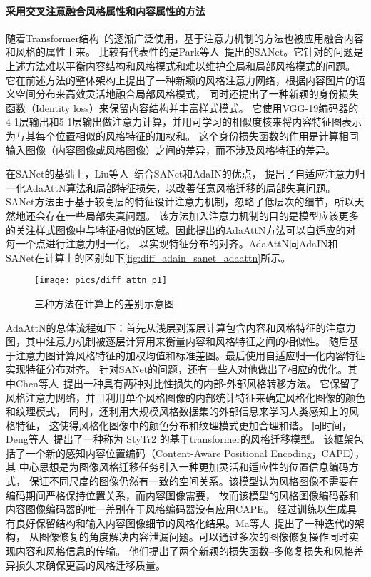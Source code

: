 \paragraph{采用交叉注意融合风格属性和内容属性的方法}
随着Transformer结构~\cite{vaswani2017attention}的逐渐广泛使用，基于注意力机制的方法也被应用融合内容和风格的属性上来。
比较有代表性的是Park等人~\cite{park2019arbitrary}提出的SANet。它针对的问题是上述方法难以平衡内容结构和风格模式和难以维护全局和局部风格模式的问题。
它在前述方法的整体架构上提出了一种新颖的风格注意力网络，根据内容图片的语义空间分布来高效灵活地融合局部风格模式，
同时还提出了一种新颖的身份损失函数（Identity loss）来保留内容结构并丰富样式模式。
它使用VGG-19编码器的4-1层输出和5-1层输出做注意力计算，并用可学习的相似度核来将内容特征图表示为与其每个位置相似的风格特征的加权和。
这个身份损失函数的作用是计算相同输入图像（内容图像或风格图像）之间的差异，而不涉及风格特征的差异。
\par 在SANet的基础上，Liu等人~\cite{liu2021adaattn}结合SANet和AdaIN的优点，
提出了自适应注意力归一化AdaAttN算法和局部特征损失，以改善任意风格迁移的局部失真问题。
SANet方法由于基于较高层的特征设计注意力机制，忽略了低层次的细节，所以天然地还会存在一些局部失真问题。
该方法加入注意力机制的目的是模型应该更多的关注样式图像中与特征相似的区域。因此提出的AdaAttN方法可以自适应的对每一个点进行注意力归一化，
以实现特征分布的对齐。AdaAttN同AdaIN和SANet在计算上的区别如下\autoref{fig:diff_adain_sanet_adaattn}所示。
\begin{figure}[htbp]
    \centering
    \texttt{[image: pics/diff\_attn\_p1]}
    \caption{\label{fig:diff_adain_sanet_adaattn}三种方法在计算上的差别示意图}
\end{figure}

AdaAttN的总体流程如下：首先从浅层到深层计算包含内容和风格特征的注意力图，其中注意力机制被逐层计算用来衡量内容和风格特征之间的相似性。
随后基于注意力图计算风格特征的加权均值和标准差图。最后使用自适应归一化内容特征实现特征分布对齐。
针对SANet的问题，还有一些人对他做出了相应的优化。其中Chen等人~\cite{chen2021artistic}提出一种具有两种对比性损失的内部-外部风格转移方法。
它保留了风格注意力网络，并且利用单个风格图像的内部统计特征来确定风格化图像的颜色和纹理模式，
同时，还利用大规模风格数据集的外部信息来学习人类感知上的风格特征，
这使得风格化图像中的颜色分布和纹理模式更加合理和谐。
同时间，Deng等人~\cite{deng2022stytr2}提出了一种称为 StyTr2 的基于transformer的风格迁移模型。
该框架包括了一个新的感知内容位置编码（Content-Aware Positional Encoding，CAPE），其
中心思想是为图像风格迁移任务引入一种更加灵活和适应性的位置信息编码方式，
保证不同尺度的图像仍然有一致的空间关系。该模型认为风格图像不需要在编码期间严格保持位置关系，而内容图像需要，
故而该模型的风格图像编码器和内容图像编码器的唯一差别在于风格编码器没有应用CAPE。
经过训练以生成具有良好保留结构和输入内容图像细节的风格化结果。Ma等人~\cite{ma2023rast}提出了一种迭代的架构，
从图像修复的角度解决内容泄漏问题。可以通过多次的图像修复操作同时实现内容和风格信息的传输。
他们提出了两个新颖的损失函数--多修复损失和风格差异损失来确保更高的风格迁移质量。

